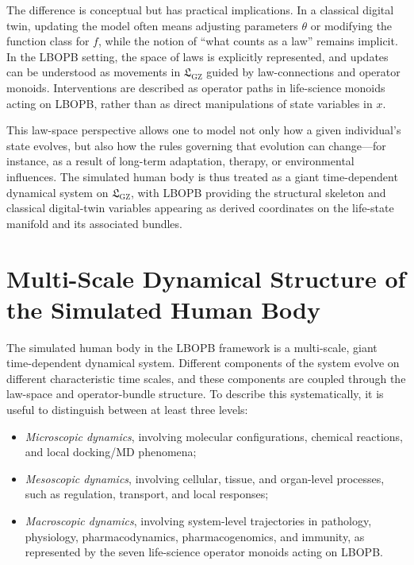 \documentclass[11pt]{book}
\theoremstyle{plain}
\theoremstyle{definition}
\theoremstyle{remark}
\newcommand{\GZLS}{\ensuremath{\mathfrak{L}_{\mathrm{GZ}}}}       \newcommand{\GZLT}{\ensuremath{M_{!w}}}                           \newcommand{\GZLOC}{\ensuremath{A_M}}                             \newcommand{\GZLCurv}{\ensuremath{\mathcal{F}_{\mathrm{law}}}}
\begin{document}
The difference is conceptual but has practical implications. In a
classical digital twin, updating the model often means adjusting
parameters $\theta$ or modifying the function class for $f$, while the
notion of ``what counts as a law'' remains implicit. In the LBOPB
setting, the space of laws is explicitly represented, and updates can
be understood as movements in $\GZLS$ guided by law-connections and
operator monoids. Interventions are described as operator paths in
life-science monoids acting on LBOPB, rather than as direct
manipulations of state variables in $x$.

This law-space perspective allows one to model not only how a given
individual's state evolves, but also how the rules governing that
evolution can change—for instance, as a result of long-term adaptation,
therapy, or environmental influences. The simulated human body is thus
treated as a giant time-dependent dynamical system on $\GZLS$, with
LBOPB providing the structural skeleton and classical digital-twin
variables appearing as derived coordinates on the life-state
manifold and its associated bundles.

\section{Multi-Scale Dynamical Structure of the Simulated Human Body}


The simulated human body in the LBOPB framework is a multi-scale,
giant time-dependent dynamical system. Different components of the
system evolve on different characteristic time scales, and these
components are coupled through the law-space and operator-bundle
structure. To describe this systematically, it is useful to distinguish
between at least three levels:

\begin{itemize}
  \item \emph{Microscopic dynamics}, involving molecular configurations,
        chemical reactions, and local docking/MD phenomena;
  \item \emph{Mesoscopic dynamics}, involving cellular, tissue, and
        organ-level processes, such as regulation, transport, and
        local responses;
  \item \emph{Macroscopic dynamics}, involving system-level trajectories
        in pathology, physiology, pharmacodynamics, pharmacogenomics,
        and immunity, as represented by the seven life-science
        operator monoids acting on LBOPB.
\end{itemize}
\end{document}
